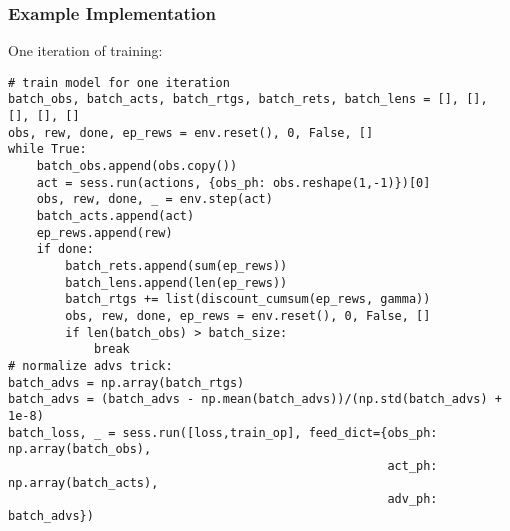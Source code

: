 \begin{frame}[fragile]\frametitle{Example Implementation}

One iteration of training:

\begin{lstlisting}
# train model for one iteration
batch_obs, batch_acts, batch_rtgs, batch_rets, batch_lens = [], [], [], [], []
obs, rew, done, ep_rews = env.reset(), 0, False, []
while True:
    batch_obs.append(obs.copy())
    act = sess.run(actions, {obs_ph: obs.reshape(1,-1)})[0]
    obs, rew, done, _ = env.step(act)
    batch_acts.append(act)
    ep_rews.append(rew)
    if done:
        batch_rets.append(sum(ep_rews))
        batch_lens.append(len(ep_rews))
        batch_rtgs += list(discount_cumsum(ep_rews, gamma))
        obs, rew, done, ep_rews = env.reset(), 0, False, []
        if len(batch_obs) > batch_size:
            break
# normalize advs trick:
batch_advs = np.array(batch_rtgs)
batch_advs = (batch_advs - np.mean(batch_advs))/(np.std(batch_advs) + 1e-8)
batch_loss, _ = sess.run([loss,train_op], feed_dict={obs_ph: np.array(batch_obs),
                                                     act_ph: np.array(batch_acts),
                                                     adv_ph: batch_advs})
\end{lstlisting}


\end{frame}

